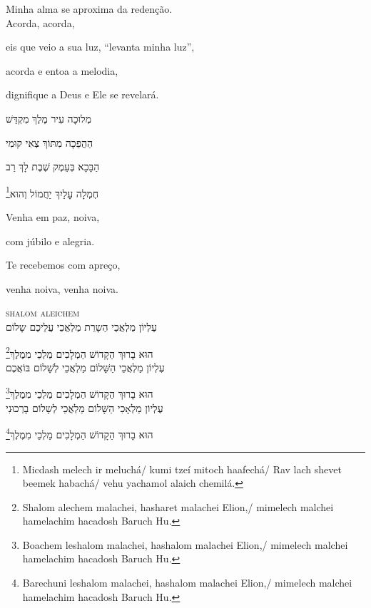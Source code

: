 Minha alma se aproxima da redenção.\\[10pt]

Acorda, acorda,

eis que veio a sua luz, ``levanta minha luz'',

acorda e entoa a melodia,

dignifique a Deus e Ele se revelará.

\movetoevenpage
\raggedleft

מְלוּכָה עִיר מֶלֶךְ  מִקְדַּשׁ

הַהֲפֵכָה מִתּוֹךְ צְאִי קוּמִי 

הַבָּכָא בְּעֵמֶק שֶׁבֶת  לָךְ רַב

\footnote{Micdash melech ir meluchá/ kumi tzeí mitoch haafechá/ 
   Rav lach shevet beemek habachá/ vehu yachamol alaich chemilá.}חֶמְלָה עָלַיִךְ יַחֲמוֹל  וְהוּא\\[10pt]

\movetooddpage
\raggedright

Venha em paz, noiva,

com júbilo e alegria.

Te recebemos com apreço,

venha noiva, venha noiva.


\movetoevenpage
\raggedleft
{}


\textsc{shalom aleichem}\\[15pt]

עֶלְיוֹן מַלְאֲכֵי הַשָרֵת מַלְאֲכֵי עֲלֵיכֶם שָלוֹם

\footnote{Shalom alechem malachei, hasharet malachei Elion,/
mimelech malchei hamelachim hacadosh Baruch Hu.}הוּא בָרוּךְ הַקָדוֹשׁ הַמְלָכִים מַלְכֵי מִמֶלֶךְ\\[10pt]

עֶלְיוֹן מַלְאֲכֵי הַשָּׁלוֹם מַלְאֲכֵי לְשָׁלוֹם בּוֹאֲכֶם

\footnote{Boachem leshalom malachei, hashalom malachei Elion,/
mimelech malchei hamelachim hacadosh Baruch Hu.}הוּא בָרוּךְ הַקָדוֹשׁ הַמְלָכִים מַלְכֵי מִמֶלֶךְ\\[10pt]

עֶלְיוֹן מַלְאָכִי הַשָּׁלוֹם מַלְאֲכֵי לְשָלוֹם בָרְכוּנִי

\footnote{Barechuni leshalom malachei, hashalom malachei Elion,/
mimelech malchei hamelachim hacadosh Baruch Hu.}הוּא בָרוּךְ הַקָדוֹשׁ הַמְלָכִים מַלְכֵי מִמֶלֶךְ\\[10pt] 

